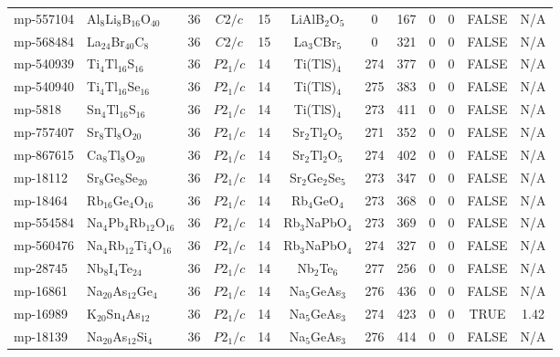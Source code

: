 {\begin{longtable}{llcccccccccc}
    mp-557104 & Al$_{8}$Li$_{8}$B$_{16}$O$_{40}$ & 36    & $C2/c$ & 15    & LiAlB$_{2}$O$_{5}$ & 0     & 167   & 0     & 0     & FALSE & N/A \\
    mp-568484 & La$_{24}$Br$_{40}$C$_{8}$ & 36    & $C2/c$ & 15    & La$_{3}$CBr$_{5}$ & 0     & 321   & 0     & 0     & FALSE & N/A \\
    mp-540939 & Ti$_{4}$Tl$_{16}$S$_{16}$ & 36    & $P2_1/c$ & 14    & Ti(TlS)$_{4}$ & 274   & 377   & 0     & 0     & FALSE & N/A \\
    mp-540940 & Ti$_{4}$Tl$_{16}$Se$_{16}$ & 36    & $P2_1/c$ & 14    & Ti(TlS)$_{4}$ & 275   & 383   & 0     & 0     & FALSE & N/A \\
    mp-5818 & Sn$_{4}$Tl$_{16}$S$_{16}$ & 36    & $P2_1/c$ & 14    & Ti(TlS)$_{4}$ & 273   & 411   & 0     & 0     & FALSE & N/A \\
    mp-757407 & Sr$_{8}$Tl$_{8}$O$_{20}$ & 36    & $P2_1/c$ & 14    & Sr$_{2}$Tl$_{2}$O$_{5}$ & 271   & 352   & 0     & 0     & FALSE & N/A \\
    mp-867615 & Ca$_{8}$Tl$_{8}$O$_{20}$ & 36    & $P2_1/c$ & 14    & Sr$_{2}$Tl$_{2}$O$_{5}$ & 274   & 402   & 0     & 0     & FALSE & N/A \\
    mp-18112 & Sr$_{8}$Ge$_{8}$Se$_{20}$ & 36    & $P2_1/c$ & 14    & Sr$_{2}$Ge$_{2}$Se$_{5}$ & 273   & 347   & 0     & 0     & FALSE & N/A \\
    mp-18464 & Rb$_{16}$Ge$_{4}$O$_{16}$ & 36    & $P2_1/c$ & 14    & Rb$_{4}$GeO$_{4}$ & 273   & 368   & 0     & 0     & FALSE & N/A \\
    mp-554584 & Na$_{4}$Pb$_{4}$Rb$_{12}$O$_{16}$ & 36    & $P2_1/c$ & 14    & Rb$_{3}$NaPbO$_{4}$ & 273   & 369   & 0     & 0     & FALSE & N/A \\
    mp-560476 & Na$_{4}$Rb$_{12}$Ti$_{4}$O$_{16}$ & 36    & $P2_1/c$ & 14    & Rb$_{3}$NaPbO$_{4}$ & 274   & 327   & 0     & 0     & FALSE & N/A \\
    mp-28745 & Nb$_{8}$I$_{4}$Te$_{24}$ & 36    & $P2_1/c$ & 14    & Nb$_{2}$Te$_{6}$ & 277   & 256   & 0     & 0     & FALSE & N/A \\
    mp-16861 & Na$_{20}$As$_{12}$Ge$_{4}$ & 36    & $P2_1/c$ & 14    & Na$_{5}$GeAs$_{3}$ & 276   & 436   & 0     & 0     & FALSE & N/A \\
    mp-16989 & K$_{20}$Sn$_{4}$As$_{12}$ & 36    & $P2_1/c$ & 14    & Na$_{5}$GeAs$_{3}$ & 274   & 423   & 0     & 0     & TRUE  & 1.42  \\
    mp-18139 & Na$_{20}$As$_{12}$Si$_{4}$ & 36    & $P2_1/c$ & 14    & Na$_{5}$GeAs$_{3}$ & 276   & 414   & 0     & 0     & FALSE & N/A \\

\end{longtable}}
